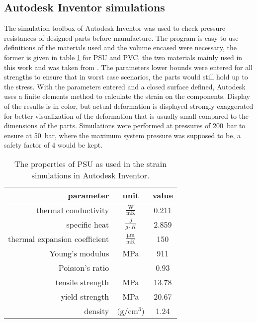     \subsection{Autodesk Inventor simulations}
    The simulation toolbox of Autodesk Inventor was used to check pressure resistances of designed parts before manufacture. The program is easy to use - definitions of the materials used and the volume encased were necessary, the former is given in table \ref{table:sim:PSU} for PSU and PVC, the two materials mainly used in this work and was taken from \cite{noauthor_basf_nodate}. The parameters lower bounds were entered for all strengths to ensure that in worst case scenarios, the parts would still hold up to the stress. With the parameters entered and a closed surface defined, Autodesk uses a finite elements method to calculate the strain on the components. Display of the results is in color, but actual deformation is displayed strongly exaggerated for better visualization of the deformation that is usually small compared to the dimensions of the parts. Simulations were performed at pressures of \SI{200}{\bar} to ensure at \SI{50}{\bar}, where the maximum system pressure was supposed to be, a safety factor of 4 would be kept.
        \begin{table}
            \label{table:sim:PSU}
            \centering
            \begin{tabular}{|r|c|c|}
                \hline
                parameter & unit & value\\
                \hline
                thermal conductivity & $\frac{\si{\watt}}{\si{\meter} \si{\kelvin}}$ & 0.211 \\
                specific heat & $\frac{J}{g\cdot K }$ & 2.859\\
                thermal expansion coefficient & $\frac{\si{\micro\meter}}{\si{\m}\si{\kelvin}}$ & 150 \\
                Young's modulus & MPa & 911\\
                Poisson's ratio && 0.93\\
                tensile strength & MPa & 13.78\\
                yield strength & MPa & 20.67\\
                density &$(\si{\g}/\si{\cm\cubed}$) & 1.24 \\
                \hline
            \end{tabular}
            \caption[PSU properties]{The properties of PSU as used in the strain simulations in Autodesk Inventor.}
        \end{table}
